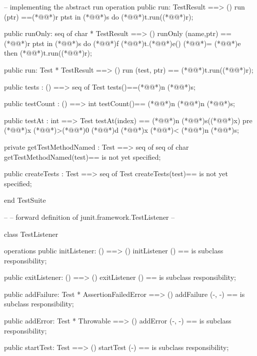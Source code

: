 \documentclass[a4paper]{article}
\begin{document}
\begin{vdm_al}
  -- implementing the abstract run operation 
  public run: TestResult ==> ()
  run (ptr) ==(*@@*)r ptst in (*@@*)s do (*@@*)t.run((*@@*)r);

  public runOnly: seq of char * TestResult ==> ()
  runOnly (name,ptr) ==
  (*@@*)r ptst in (*@@*)s do
  (*@@*)f (*@@*)t.(*@@*)e() (*@\vdmnotcovered{}@*)= (*@@*)e then
 (*@@*)t.run((*@@*)r);
  
  public run: Test * TestResult ==> ()
  run (test, ptr) == (*@@*)t.run((*@@*)r);
      
    public tests : () ==> seq of Test
    tests()==(*@@*)n (*@@*)s;
    
    public testCount : () ==> int
    testCount()== (*@@*)n (*@@*)n (*@@*)s;
    
    public testAt : int ==> Test
    testAt(index) == (*@@*)n (*@@*)s((*@@*)x)
    pre (*@@*)x (*@\vdmnotcovered{}@*)>(*@\vdmnotcovered{}@*)0 (*@@*)d (*@@*)x (*@\vdmnotcovered{}@*)< (*@@*)n (*@@*)s;


  private getTestMethodNamed : Test ==> seq of seq of char
  getTestMethodNamed(test)== is not yet specified;

  public createTests : Test ==> seq of Test
  createTests(test)== is not yet specified;


end TestSuite

--
-- forward definition of junit.framework.TestListener
--

class TestListener

operations
  public initListener: () ==> ()
  initListener () == is subclass responsibility;
  
  public exitListener: () ==> ()
  exitListener () == is subclass responsibility;
  
  public addFailure: Test * AssertionFailedError ==> ()
  addFailure (-, -) == is subclass responsibility; 

  public addError: Test * Throwable ==> ()
  addError (-, -) == is subclass responsibility;
  
  public startTest: Test ==> ()
  startTest (-) == is subclass responsibility;
  

\end{vdm_al}
\end{document}
